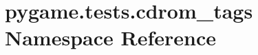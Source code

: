 \hypertarget{namespacepygame_1_1tests_1_1cdrom__tags}{}\section{pygame.\+tests.\+cdrom\+\_\+tags Namespace Reference}
\label{namespacepygame_1_1tests_1_1cdrom__tags}

